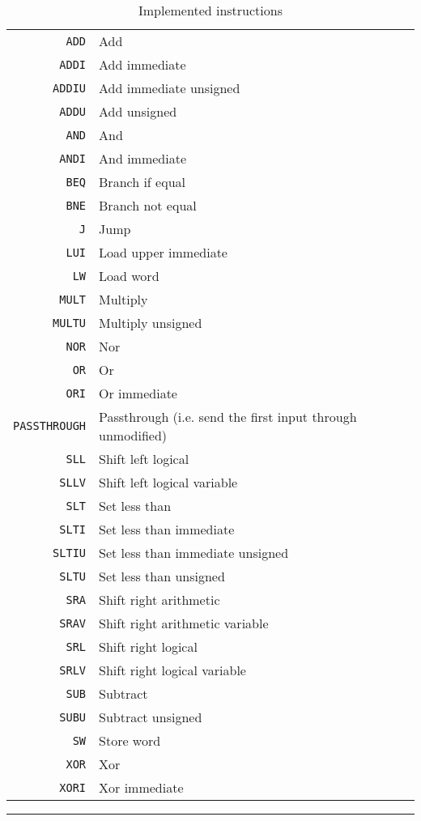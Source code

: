 \begin{table}
    \begin{center}
        \begin{tabular}{r|l}
            \texttt{ADD} & Add \\
            \texttt{ADDI} & Add immediate \\
            \texttt{ADDIU} & Add immediate unsigned \\
            \texttt{ADDU} & Add unsigned \\
            \texttt{AND} & And \\
            \texttt{ANDI} & And immediate \\
            \texttt{BEQ} & Branch if equal \\
            \texttt{BNE} & Branch not equal \\
            \texttt{J} & Jump \\
            \texttt{LUI} & Load upper immediate \\
            \texttt{LW} & Load word \\
            \texttt{MULT} & Multiply \\
            \texttt{MULTU} & Multiply unsigned \\
            \texttt{NOR} & Nor \\
            \texttt{OR} & Or \\
            \texttt{ORI} & Or immediate \\
            \texttt{PASSTHROUGH} & Passthrough (i.e. send the first input through unmodified) \\
            \texttt{SLL} & Shift left logical \\
            \texttt{SLLV} & Shift left logical variable \\
            \texttt{SLT} & Set less than \\
            \texttt{SLTI} & Set less than immediate \\
            \texttt{SLTIU} & Set less than immediate unsigned \\
            \texttt{SLTU} & Set less than unsigned \\
            \texttt{SRA} & Shift right arithmetic \\
            \texttt{SRAV} & Shift right arithmetic variable \\
            \texttt{SRL} & Shift right logical \\
            \texttt{SRLV} & Shift right logical variable \\
            \texttt{SUB} & Subtract \\
            \texttt{SUBU} & Subtract unsigned \\
            \texttt{SW} & Store word \\
            \texttt{XOR} & Xor \\
            \texttt{XORI} & Xor immediate \\
        \end{tabular}
        \smallskip
        \hrule
        \smallskip
        \caption{Implemented instructions}
        \label{table:implemented-instructions}
    \end{center}
\end{table}

